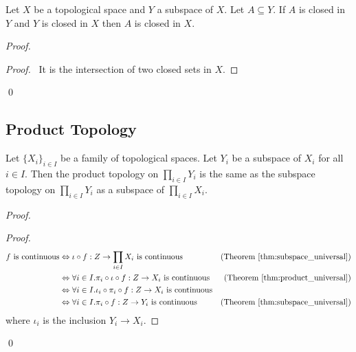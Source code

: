 \begin{prop}
Let $X$ be a topological space and $Y$ a subspace of $X$. Let $A \subseteq Y$. If $A$ is closed in $Y$ and $Y$ is closed in $X$ then $A$ is closed in $X$.
\end{prop}

\begin{proof}
\pf
{}
\begin{proof}
	\pf\ It is the intersection of two closed sets in $X$.
\end{proof}
\qed
\end{proof}

\subsection{Product Topology}

\begin{prop}
Let $\{X_i\}_{i \in I}$ be a family of topological spaces. Let $Y_i$ be a subspace of $X_i$ for all $i \in I$. Then the product topology on $\prod_{i \in I} Y_i$ is the same as the subspace topology on $\prod_{i \in I} Y_i$ as a subspace of $\prod_{i \in I} X_i$.
\end{prop}

\begin{proof}
\pf
{}
\begin{proof}
	\pf
	\begin{align*}
		f \text{ is continuous}
		& \Leftrightarrow \iota \circ f : Z \rightarrow \prod_{i \in I} X_i \text{ is continuous} & (\text{Theorem \ref{thm:subspace_universal}}) \\
		& \Leftrightarrow \forall i \in I. \pi_i \circ \iota \circ f : Z \rightarrow X_i \text{ is continuous} & (\text{Theorem \ref{thm:product_universal}}) \\
		& \Leftrightarrow \forall i \in I. \iota_i \circ \pi_i \circ f : Z \rightarrow X_i \text{ is continuous} \\
		& \Leftrightarrow \forall i \in I. \pi_i \circ f : Z \rightarrow Y_i \text{ is continuous}
		& (\text{Theorem \ref{thm:subspace_universal}})
	\end{align*}
	where $\iota_i$ is the inclusion $Y_i \rightarrow X_i$.
\end{proof}
\qed
\end{proof}

